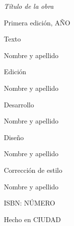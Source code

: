 \documentclass[12pt,a5paper,oneside]{book}
\begin{document}
{\footnotesize
\thispagestyle{empty}

\noindent\textit{Título de la obra}
\vspace{12pt}

\noindent Primera edición, AÑO
\vspace{12pt}

\noindent Texto

\noindent Nombre y apellido
\vspace{12pt}

\noindent Edición

\noindent Nombre y apellido
\vspace{12pt}

\noindent Desarrollo

\noindent Nombre y apellido
\vspace{12pt}

\noindent Diseño

\noindent Nombre y apellido
\vspace{12pt}

\noindent Corrección de estilo

\noindent Nombre y apellido
\vspace{12pt}

\noindent ISBN: NÚMERO
\vspace{12pt}

\noindent Hecho en CIUDAD
\cleardoublepage{}
}

\frontmatter

{\small
\makeatletter
\renewcommand{\l@chapter}{\@dottedtocline{1}{0em}{2em}}
\makeatother
\thispagestyle{empty}
\renewcommand{\contentsname}{Índice}
\tableofcontents
\cleardoublepage{}
}





\mainmatter






\backmatter



\appendix


\end{document}
